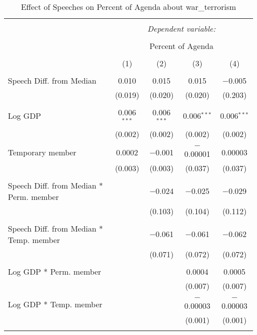 
\begin{table}[!htbp] \centering 
  \caption{Effect of Speeches on Percent of Agenda about war_terrorism} 
  \label{} 
\begin{tabular}{@{\extracolsep{5pt}}lcccc} 
\\[-1.8ex]\hline 
\hline \\[-1.8ex] 
 & \multicolumn{4}{c}{\textit{Dependent variable:}} \\ 
\cline{2-5} 
\\[-1.8ex] & \multicolumn{4}{c}{Percent of Agenda} \\ 
\\[-1.8ex] & (1) & (2) & (3) & (4)\\ 
\hline \\[-1.8ex] 
 Speech Diff. from Median & 0.010 & 0.015 & 0.015 & $-$0.005 \\ 
  & (0.019) & (0.020) & (0.020) & (0.203) \\ 
  & & & & \\ 
 Log GDP & 0.006$^{***}$ & 0.006$^{***}$ & 0.006$^{***}$ & 0.006$^{***}$ \\ 
  & (0.002) & (0.002) & (0.002) & (0.002) \\ 
  & & & & \\ 
 Temporary member & 0.0002 & $-$0.001 & $-$0.00001 & 0.00003 \\ 
  & (0.003) & (0.003) & (0.037) & (0.037) \\ 
  & & & & \\ 
 Speech Diff. from Median * Perm. member &  & $-$0.024 & $-$0.025 & $-$0.029 \\ 
  &  & (0.103) & (0.104) & (0.112) \\ 
  & & & & \\ 
 Speech Diff. from Median * Temp. member &  & $-$0.061 & $-$0.061 & $-$0.062 \\ 
  &  & (0.071) & (0.072) & (0.072) \\ 
  & & & & \\ 
 Log GDP * Perm. member &  &  & 0.0004 & 0.0005 \\ 
  &  &  & (0.007) & (0.007) \\ 
  & & & & \\ 
 Log GDP * Temp. member &  &  & $-$0.00003 & $-$0.00003 \\ 
  &  &  & (0.001) & (0.001) \\ 
  & & & & \\ 

\end{tabular}
\end{table}
